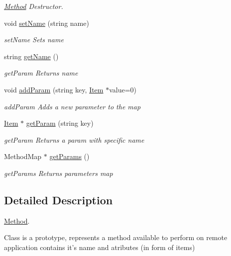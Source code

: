 \begin{DoxyCompactItemize}
\begin{DoxyCompactList}\small\item\em \hyperlink{class_method}{\-Method} \-Destructor. \end{DoxyCompactList}\item 
void \hyperlink{class_method_afdebbd506c867fc01bb0f10d13673b5d}{set\-Name} (string name)
\begin{DoxyCompactList}\small\item\em set\-Name \-Sets name \end{DoxyCompactList}\item 
string \hyperlink{class_method_aed399e3341d3dd33e9f629ac3b4d9cfa}{get\-Name} ()
\begin{DoxyCompactList}\small\item\em get\-Param \-Returns name \end{DoxyCompactList}\item 
void \hyperlink{class_method_a0c6dc9869de37f905240bdf568f148d9}{add\-Param} (string key, \hyperlink{class_item}{\-Item} $\ast$value=0)
\begin{DoxyCompactList}\small\item\em add\-Param \-Adds a new parameter to the map \end{DoxyCompactList}\item 
\hyperlink{class_item}{\-Item} $\ast$ \hyperlink{class_method_a104de777e962b8e8214ae263c49cb01f}{get\-Param} (string key)
\begin{DoxyCompactList}\small\item\em get\-Param \-Returns a param with specific name \end{DoxyCompactList}\item 
\-Method\-Map $\ast$ \hyperlink{class_method_a92affa9ad0f17716a082047e2752bfe9}{get\-Params} ()
\begin{DoxyCompactList}\small\item\em get\-Params \-Returns parameters map \end{DoxyCompactList}\end{DoxyCompactItemize}


\subsection{\-Detailed \-Description}
\hyperlink{class_method}{\-Method}. 

\-Class is a prototype, represents a method available to perform on remote application contains it's name and atributes (in form of items) 

